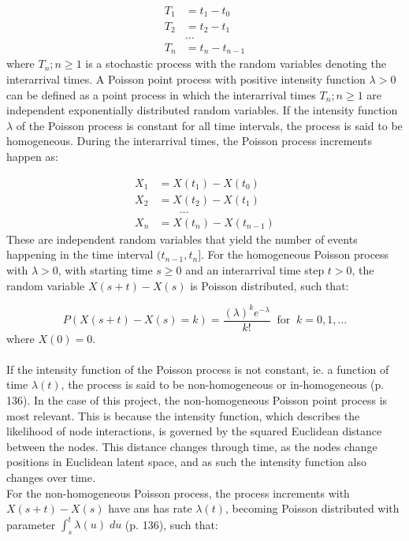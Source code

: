 \begin{align*}
T_1 &= t_1 - t_0 \\
T_2 &= t_2 - t_1 \\
&\dots \\
T_n &= t_n - t_{n-1}
\end{align*}
where ${T_n ; n \ge 1}$ is a stochastic process with the random variables denoting the interarrival times.
\clearpage
A Poisson point process with positive intensity function $\lambda > 0$ can be defined as a point process in which the interarrival times ${T_n ; n \ge 1}$ are independent exponentially distributed random variables. 
If the intensity function $\lambda$ of the Poisson process is constant for all time intervals, the process is said to be homogeneous. 
During the interarrival times, the Poisson process increments happen as:

\begin{align*}
X_1 &= X(t_1) - X(t_0) \\
X_2 &= X(t_2) - X(t_1) \\
&\;\;\;\;\;\;\;\dots \\
X_n &= X(t_n) - X(t_{n-1})
\end{align*}
These are independent random variables that yield the number of events happening in the time interval $(t_{n-1}, t_n]$. 
For the homogeneous Poisson process with $\lambda > 0$, with starting time $s \ge 0$ and an interarrival time step $t > 0$, the random variable $X(s+t) - X(s)$ is Poisson distributed, such that:

\begin{equation}
    P(X(s+t) - X(s) = k) = \frac{(\lambda)^k e^{-\lambda}}{k!} \;\; \text{for} \;\; k=0,1,\dots
\end{equation}
where $X(0) = 0$.
\\\\
If the intensity function of the Poisson process is not constant, ie. a function of time $\lambda(t)$, the process is said to be non-homogeneous or in-homogeneous \cite{Bas2019AProcess} (p. 136).
In the case of this project, the non-homogeneous Poisson point process is most relevant. 
This is because the intensity function, which describes the likelihood of node interactions, is governed by the squared Euclidean distance between the nodes. 
This distance changes through time, as the nodes change positions in Euclidean latent space, and as such the intensity function also changes over time.
\\
For the non-homogeneous Poisson process, the process increments with $X(s+t) - X(s)$ have ans has rate $\lambda(t)$, becoming Poisson distributed with parameter $\int_s^t \lambda(u)\; du$ \cite{Bas2019AProcess} (p. 136), such that:

